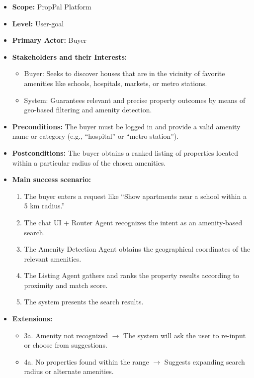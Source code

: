 \begin{itemize}
    \item \textbf{Scope:} PropPal Platform
    \item \textbf{Level:} User-goal
    \item \textbf{Primary Actor:} Buyer
    \item \textbf{Stakeholders and their Interests:}
    \begin{itemize}
        \item Buyer: Seeks to discover houses that are in the vicinity of favorite amenities like schools, hospitals, markets, or metro stations.
        \item System: Guarantees relevant and precise property outcomes by means of geo-based filtering and amenity detection.
    \end{itemize}
    \item \textbf{Preconditions:} The buyer must be logged in and provide a valid amenity name or category (e.g., ``hospital'' or ``metro station'').
    \item \textbf{Postconditions:} The buyer obtains a ranked listing of properties located within a particular radius of the chosen amenities.
    \item \textbf{Main success scenario:}
    \begin{enumerate}
        \item The buyer enters a request like ``Show apartments near a school within a 5 km radius.''
        \item The chat UI + Router Agent recognizes the intent as an amenity-based search.
        \item The Amenity Detection Agent obtains the geographical coordinates of the relevant amenities.
        \item The Listing Agent gathers and ranks the property results according to proximity and match score.
        \item The system presents the search results.
    \end{enumerate}
    \item \textbf{Extensions:}
    \begin{itemize}
        \item 3a. Amenity not recognized $\rightarrow$ The system will ask the user to re-input or choose from suggestions.
        \item 4a. No properties found within the range $\rightarrow$ Suggests expanding search radius or alternate amenities.
    \end{itemize}
\end{itemize}

